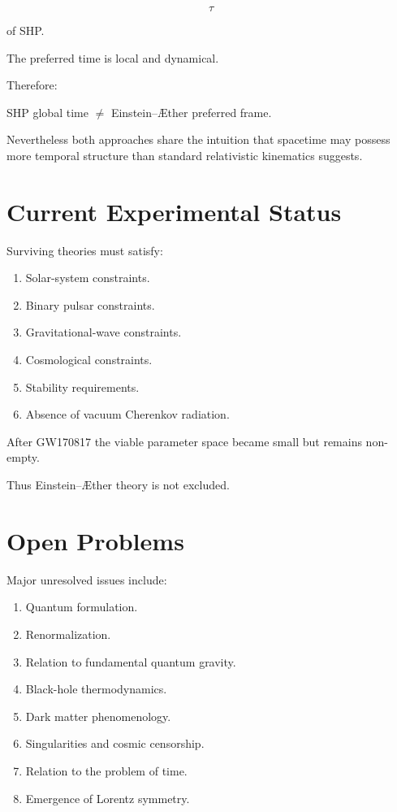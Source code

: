 \documentclass[11pt,a4paper]{article}
\begin{document}
\begin{equation}
\tau
\end{equation}

of SHP.

The preferred time is local and dynamical.

Therefore:

\begin{center}
SHP global time
$\neq$
Einstein--\AE ther preferred frame.
\end{center}

Nevertheless both approaches share the intuition that spacetime
may possess more temporal structure than standard relativistic
kinematics suggests.

\section{Current Experimental Status}

Surviving theories must satisfy:

\begin{enumerate}
\item Solar-system constraints.
\item Binary pulsar constraints.
\item Gravitational-wave constraints.
\item Cosmological constraints.
\item Stability requirements.
\item Absence of vacuum Cherenkov radiation.
\end{enumerate}

After GW170817 the viable parameter space became small but remains
non-empty.

Thus Einstein--\AE ther theory is not excluded.

\section{Open Problems}

Major unresolved issues include:

\begin{enumerate}
\item Quantum formulation.
\item Renormalization.
\item Relation to fundamental quantum gravity.
\item Black-hole thermodynamics.
\item Dark matter phenomenology.
\item Singularities and cosmic censorship.
\item Relation to the problem of time.
\item Emergence of Lorentz symmetry.
\end{enumerate}
\end{document}

